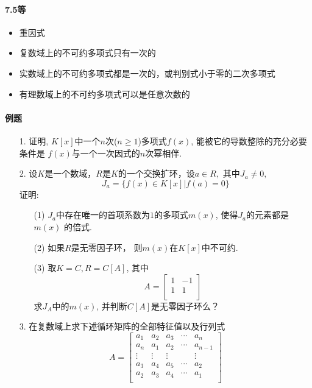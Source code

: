 \paragraph{7.5等}
\begin{itemize}
    \item 重因式
    \item 复数域上的不可约多项式只有一次的
    \item 实数域上的不可约多项式都是一次的，或判别式小于零的二次多项式
    \item 有理数域上的不可约多项式可以是任意次数的
\end{itemize}

\paragraph{例题}
\begin{itemize}
\item[1.] 证明, $K[x]$中一个$n$次($n\ge 1$)多项式$f(x)$, 能被它的导数整除的充分必要条件是
$f(x)$与一个一次因式的$n$次幂相伴.
\vspace{2cm}

\item[2.] 设$K$是一个数域，$R$是$K$的一个交换扩环，设$a\in R,$ 其中$J_a \ne {0},$
$$ J_a = \{f(x) \in K[x] | f(a) = 0\}$$ 
证明:
\begin{itemize}
    \item [(1)] $J_a$中存在唯一的首项系数为$1$的多项式$m(x)$, 使得$J_a$的元素都是$m(x)$
    的倍式.
    \vspace{2cm}

    \item [(2)] 如果$R$是无零因子环， 则$m(x)$在$K[x]$中不可约.
    \vspace{2cm}

    \item [(3)] 取$K=C, R=C[A]$, 其中
    \begin{equation}
        \nonumber
        A=\begin{bmatrix}
            1& -1\\
            1& 1\\
        \end{bmatrix}
    \end{equation}
    求$J_A$中的$m(x)$, 并判断$C[A]$是无零因子环么？
    \vspace{2cm}
\end{itemize}

\item[3.] 在复数域上求下述循环矩阵的全部特征值以及行列式
\begin{equation}
    \nonumber
    A=\begin{bmatrix}
        a_1& a_2& a_3& \cdots& a_n\\
        a_n& a_1& a_2& \cdots& a_{n-1}\\
        \vdots& \vdots& \vdots& &\vdots\\
        a_3& a_4& a_5& \cdots& a_{2}\\
        a_2& a_3& a_4& \cdots& a_{1}\\
    \end{bmatrix}
\end{equation}
\vspace{2cm}
\end{itemize}


